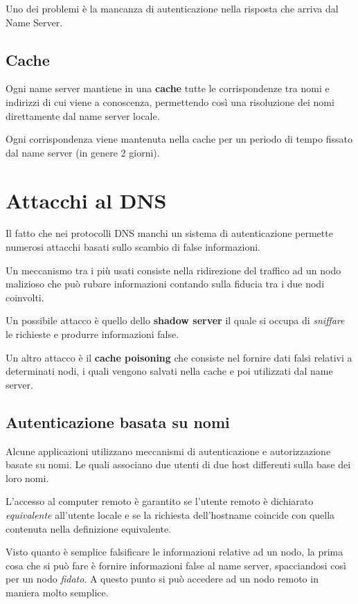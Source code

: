 Uno dei problemi è la mancanza di autenticazione nella risposta che arriva dal Name Server.

\subsection{Cache}
Ogni name server mantiene in una \textbf{cache} tutte le corrispondenze tra nomi e indirizzi di cui viene a
conoscenza, permettendo così una risoluzione dei nomi direttamente dal name server locale.

Ogni corrispondenza viene mantenuta nella cache per un periodo di tempo fissato dal name server (in genere 2 giorni).

\section{Attacchi al DNS}
Il fatto che nei protocolli DNS manchi un sistema di autenticazione permette numerosi attacchi basati sullo scambio
di false informazioni.

Un meccanismo tra i più usati consiste nella ridirezione del traffico ad un nodo malizioso che può rubare informazioni
contando sulla fiducia tra i due nodi coinvolti.

Un possibile attacco è quello dello \textbf{shadow server} il quale si occupa di \emph{sniffare} le richieste e
produrre informazioni false.

Un altro attacco è il \textbf{cache poisoning} che consiste nel fornire dati falsi relativi a determinati nodi, i
quali vengono salvati nella cache e poi utilizzati dal name server.

\subsection{Autenticazione basata su nomi}
Alcune applicazioni utilizzano meccanismi di autenticazione e autorizzazione basate su nomi. Le quali associano
due utenti di due host differenti sulla base dei loro nomi.

L'accesso al computer remoto è garantito se l'utente remoto è dichiarato \emph{equivalente} all'utente locale e se
la richiesta dell'hostname coincide con quella contenuta nella definizione equivalente.

Visto quanto è semplice falsificare le informazioni relative ad un nodo, la prima cosa che si può fare è fornire
informazioni false al name server, spacciandosi così per un nodo \emph{fidato}. A questo punto si può accedere ad
un nodo remoto in maniera molto semplice.

